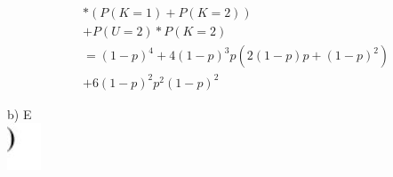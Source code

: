 \documentclass[10pt]{article}
\begin{document}
{$$
\begin{aligned}
& *(P(K=1)+P(K=2)) \\
&+P(U=2) * P(K=2) \\
&=(1-p)^{4}+4(1-p)^{3} p\left(2(1-p) p+(1-p)^{2}\right) \\
&+6(1-p)^{2} p^{2}(1-p)^{2}
\end{aligned}
$$

b) E\\
\includegraphics[width=\linewidth]{images/2024_12_29_0906b02acf849bda8665g-5(17)}\\
}
\end{document}
